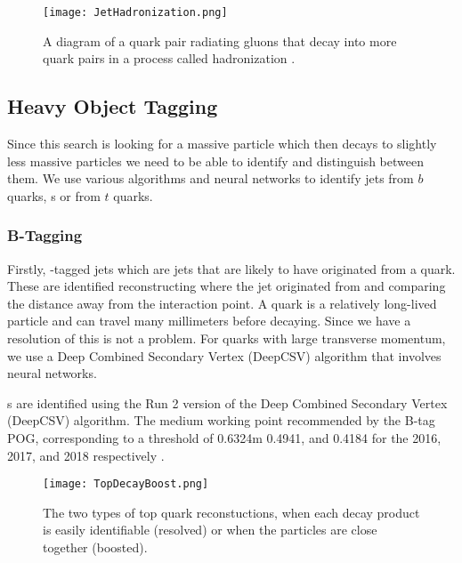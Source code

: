 \begin{figure}
 	\centering
	\texttt{[image: JetHadronization.png]}
 	\caption[Jet Hadronization]{A diagram of a quark pair radiating gluons that decay into more quark pairs in a process called hadronization \cite{griffiths_introduction_2008}.}
 	\label{JetHadronization} 
\end{figure}

\subsection{Heavy Object Tagging}\label{HeavyObject}
Since this search is looking for a massive particle which then decays to slightly less massive particles we need to be able to identify and distinguish between them. We use various algorithms and neural networks to identify jets from $b$ quarks, \bjet s or from $t$ quarks. 

\subsubsection{B-Tagging}\label{Btagging}
Firstly, \B-tagged jets which are jets that are likely to have originated from a \B{} quark. These are identified reconstructing where the jet originated from and comparing the distance away from the interaction point. A \B{} quark is a relatively long-lived particle and can travel many millimeters before decaying. Since we have a resolution of \mum{} this is not a problem. For \B{} quarks with large transverse momentum, we use a Deep Combined Secondary Vertex (DeepCSV) algorithm that involves neural networks. 

\bjet s{} are identified using the Run 2 version of the Deep Combined Secondary Vertex (DeepCSV) algorithm. The medium working point recommended by the B-tag POG, corresponding to a threshold of 0.6324m 0.4941, and 0.4184 for the 2016, 2017, and 2018 respectively \cite{noauthor_btagrecommendation2016legacy_nodate, noauthor_btagrecommendation94x_nodate, noauthor_btagrecommendation102x_nodate}.

\begin{figure}
 	\centering
	\texttt{[image: TopDecayBoost.png]}
 	\caption[Top Decays]{The two types of top quark reconstuctions, when each decay product is easily identifiable (resolved) or when the particles are close together (boosted).}
 	\label{TopDecays} 
\end{figure}

